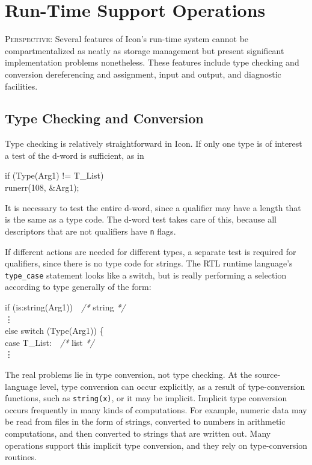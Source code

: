 \chapter{Run-Time Support Operations}
\label{RT-Chapter}

\textsc{Perspective}: Several features of Icon's run-time system
cannot be compartmentalized as neatly as storage management but
present significant implementation problems nonetheless. These
features include type checking and conversion dereferencing and
assignment, input and output, and diagnostic facilities.

\section{Type Checking and Conversion}

Type checking is relatively straightforward in Icon. If only one type
is of interest a test of the d-word is sufficient, as in

\begin{iconcode}
\>if (Type(Arg1) != T\_List)\\
\>\>runerr(108, \&Arg1);
\end{iconcode}

It is necessary to test the entire d-word, since a qualifier may have
a length that is the same as a type code. The d-word test takes care
of this, because all descriptors that are not qualifiers have \texttt{n} flags.

If different actions are needed for different types, a separate test
is required for qualifiers, since there is no type code for
strings. The RTL runtime language's \texttt{type\_case} statement
looks like a switch, but is really performing a selection according to
type generally of the form:

\begin{iconcode}
\>if (is:string(Arg1))\textit{\ \ /* }string \textit{*/}\\
\>\>\>\vdots\\
\>else switch (Type(Arg1)) \{\\
\>\> case T\_List:\textit{\ \ /* }list \textit{*/}\\
\>\>\>\vdots
\end{iconcode}

The real problems lie in type conversion, not type checking. At the
source-language level, type conversion can occur explicitly, as a
result of type-conversion functions, such as \texttt{string(x)}, or it
may be implicit. Implicit type conversion occurs frequently in many
kinds of computations. For example, numeric data may be read from
files in the form of strings, converted to numbers in arithmetic
computations, and then converted to strings that are written out.
Many operations support this implicit type conversion, and they rely
on type-conversion routines.


